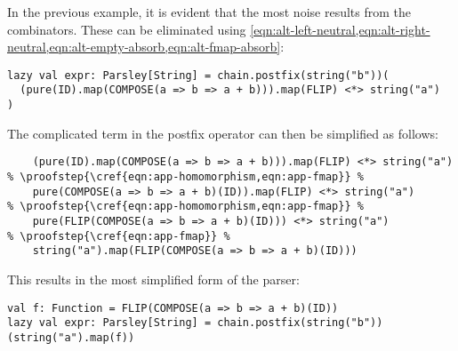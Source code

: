 \documentclass[../../main.tex]{subfiles}
\begin{document}
In the previous example, it is evident that the most noise results from the  combinators.
These can be eliminated using \cref{eqn:alt-left-neutral,eqn:alt-right-neutral,eqn:alt-empty-absorb,eqn:alt-fmap-absorb}:
\begin{verbatim}
lazy val expr: Parsley[String] = chain.postfix(string("b"))(
  (pure(ID).map(COMPOSE(a => b => a + b))).map(FLIP) <*> string("a")
)
\end{verbatim}
%
The complicated term in the postfix operator can then be simplified as follows:
\begin{verbatim}
    (pure(ID).map(COMPOSE(a => b => a + b))).map(FLIP) <*> string("a")
% \proofstep{\cref{eqn:app-homomorphism,eqn:app-fmap}} %
    pure(COMPOSE(a => b => a + b)(ID)).map(FLIP) <*> string("a")
% \proofstep{\cref{eqn:app-homomorphism,eqn:app-fmap}} %
    pure(FLIP(COMPOSE(a => b => a + b)(ID))) <*> string("a")
% \proofstep{\cref{eqn:app-fmap}} %
    string("a").map(FLIP(COMPOSE(a => b => a + b)(ID)))
\end{verbatim}
%
This results in the most simplified form of the parser:
\begin{verbatim}
val f: Function = FLIP(COMPOSE(a => b => a + b)(ID))
lazy val expr: Parsley[String] = chain.postfix(string("b"))(string("a").map(f))
\end{verbatim}
\end{document}
